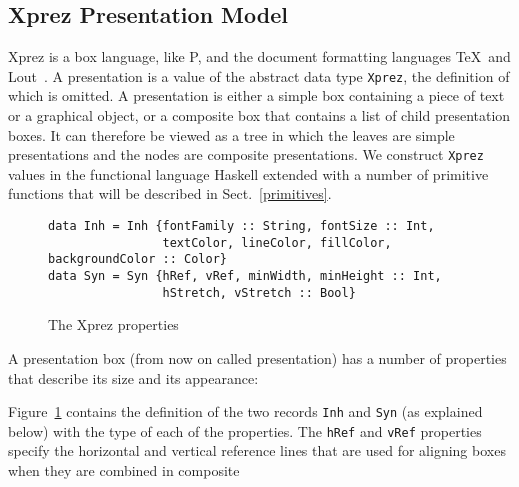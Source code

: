 \subsection{{\sc Xprez} Presentation Model}

\par {\sc Xprez} is a box language, like P, and the document formatting
        languages \TeX ~and Lout~\cite{lout}. A presentation is a value of the abstract data type
        \texttt{Xprez}, the definition of which is omitted. A presentation is either a
        simple box containing a piece of text or a graphical object, or a composite box
        that contains a list of child presentation boxes. It can therefore be viewed as
        a tree in which the leaves are simple presentations and the nodes are composite
        presentations. We construct \texttt{Xprez} values in the functional language
        Haskell extended with a number of primitive functions that will be described in
        Sect.~\ref{primitives}.
\begin{figure}
\begin{small}
\begin{center}
\begin{small}\begin{verbatim}data Inh = Inh {fontFamily :: String, fontSize :: Int,
                textColor, lineColor, fillColor, backgroundColor :: Color} 
data Syn = Syn {hRef, vRef, minWidth, minHeight :: Int,
                hStretch, vStretch :: Bool}\end{verbatim}\end{small}
\caption{The {\sc Xprez} properties}\label{xprezproperties} 
\end{center}
\end{small}
\end{figure}
\pagebreak
\par A presentation box (from now on called presentation) has a number of
        properties that describe its size and its appearance: \begin{center}
\end{center}
\par \noindent Figure~\ref{xprezproperties} contains
        the definition of the two records \texttt{Inh} and \texttt{Syn} (as explained
        below) with the type of each of the properties. The \texttt{hRef} and
        \texttt{vRef} properties specify the horizontal and vertical reference lines
        that are used for aligning boxes when they are combined in composite
